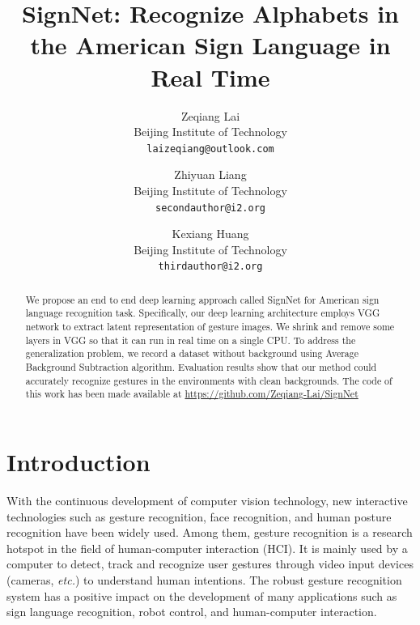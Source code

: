 \documentclass[10pt,twocolumn,letterpaper]{article}
\begin{document}
\title{SignNet: Recognize Alphabets in the American Sign Language in Real Time}

\author{
Zeqiang Lai\\
Beijing Institute of Technology\\
{\tt\small laizeqiang@outlook.com}
\and
Zhiyuan Liang\\
Beijing Institute of Technology\\
{\tt\small secondauthor@i2.org}
\and
Kexiang Huang\\
Beijing Institute of Technology\\
{\tt\small thirdauthor@i2.org}
}

\maketitle

\begin{abstract}
   We propose an end to end deep learning approach called SignNet for American sign language recognition task. Specifically, our deep learning architecture employs VGG network to extract latent representation of gesture images. We shrink and remove some layers in VGG so that it can run in real time on a single CPU. To address the generalization problem, we record a dataset without background using Average Background Subtraction algorithm. Evaluation results show that our method could accurately recognize gestures in the environments with clean backgrounds.
   The code of this work has been made available at \url{https://github.com/Zeqiang-Lai/SignNet}
\end{abstract}

\section{Introduction}

With the continuous development of computer vision technology, new interactive technologies such as gesture recognition, face recognition, and human posture recognition have been widely used. Among them, gesture recognition is a research hotspot in the field of human-computer interaction (HCI). It is mainly used by a computer to detect, track and recognize user gestures through video input devices (cameras, \textit{etc.}) to understand human intentions. The robust gesture recognition system has a positive impact on the development of many applications such as sign language recognition, robot control, and human-computer interaction.
\end{document}
